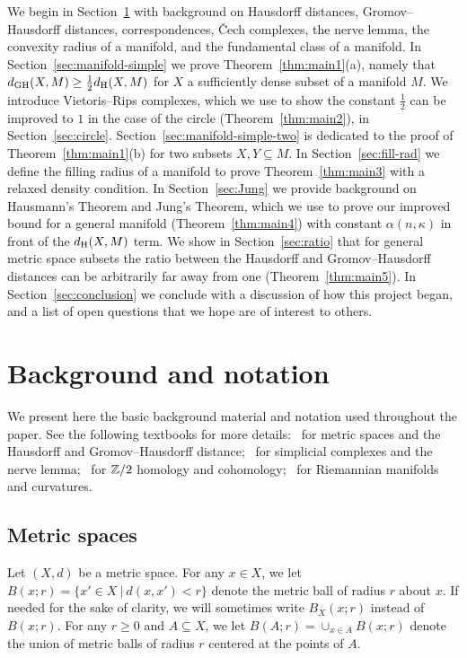 \documentclass[11pt, reqno, english]{amsart}
\begin{document}
We begin in Section~\ref{sec:background} with background on Hausdorff distances, Gromov--Hausdorff distances, correspondences, \v{C}ech complexes, the nerve lemma, the convexity radius of a manifold, and the fundamental class of a manifold.
In Section~\ref{sec:manifold-simple} we prove Theorem~\ref{thm:main1}(a), namely that $d_{\mathrm{GH}}(X,M)\geq\frac{1}{2}d_{\mathrm{H}}(X,M)$ for $X$ a sufficiently dense subset of a manifold $M$.
We introduce Vietoris--Rips complexes, which we use to show the constant $\frac{1}{2}$ can be improved to $1$ in the case of the circle (Theorem~\ref{thm:main2}), in Section~\ref{sec:circle}.
Section~\ref{sec:manifold-simple-two} is dedicated to the proof of Theorem~\ref{thm:main1}(b) for two subsets $X,Y\subseteq M$.
In Section~\ref{sec:fill-rad} we define the filling radius of a manifold to prove Theorem~\ref{thm:main3} with a relaxed density condition.
In Section~\ref{sec:Jung} we provide background on Hausmann's Theorem and Jung's Theorem,
which we use to prove our improved bound for a general manifold (Theorem~\ref{thm:main4}) with constant $\alpha(n,\kappa)$ in front of the $d_{\mathrm{H}}(X,M)$ term. 
We show in Section~\ref{sec:ratio} that for general metric space subsets the ratio between the Hausdorff and Gromov--Hausdorff distances can be arbitrarily far away from one (Theorem~\ref{thm:main5}).
In Section~\ref{sec:conclusion} we conclude with a discussion of how this project began, and a list of open questions that we hope are of interest to others.

\section{Background and notation}
\label{sec:background}

We present here the basic background material and notation used throughout the paper.
See the following textbooks for more details:~\cite{BuragoBuragoIvanov} for metric spaces and the Hausdorff and Gromov--Hausdorff distance;~\cite{Kozlov-book} for simplicial complexes and the nerve lemma;~\cite{hausmann2015mod} for $\mathbb{Z}/2$ homology and cohomology;~\cite{berger2007panoramic} for Riemannian manifolds and curvatures.


\subsection*{Metric spaces}
Let $(X,d)$ be a metric space.
For any $x\in X$, we let $B(x;r)=\{x'\in X~|~d(x,x') < r\}$ denote the metric ball of radius $r$ about $x$.
If needed for the sake of clarity, we will sometimes write $B_X(x;r)$ instead of $B(x;r)$.
For any $r\geq 0$ and $A\subseteq X$, we let $B(A;r)=\cup_{x\in A}B(x;r)$ denote the union of metric balls of radius $r$ centered at the points of $A$. 
\end{document}
